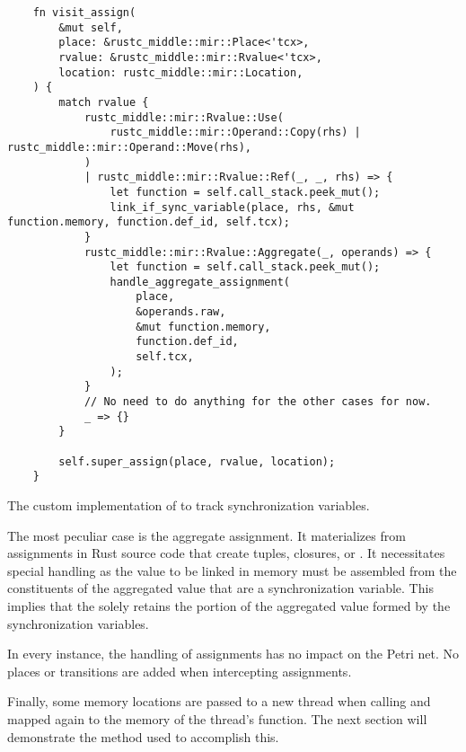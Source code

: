\begin{listing}[!htb]
  \begin{verbatim}
    fn visit_assign(
        &mut self,
        place: &rustc_middle::mir::Place<'tcx>,
        rvalue: &rustc_middle::mir::Rvalue<'tcx>,
        location: rustc_middle::mir::Location,
    ) {
        match rvalue {
            rustc_middle::mir::Rvalue::Use(
                rustc_middle::mir::Operand::Copy(rhs) | rustc_middle::mir::Operand::Move(rhs),
            )
            | rustc_middle::mir::Rvalue::Ref(_, _, rhs) => {
                let function = self.call_stack.peek_mut();
                link_if_sync_variable(place, rhs, &mut function.memory, function.def_id, self.tcx);
            }
            rustc_middle::mir::Rvalue::Aggregate(_, operands) => {
                let function = self.call_stack.peek_mut();
                handle_aggregate_assignment(
                    place,
                    &operands.raw,
                    &mut function.memory,
                    function.def_id,
                    self.tcx,
                );
            }
            // No need to do anything for the other cases for now.
            _ => {}
        }

        self.super_assign(place, rvalue, location);
    }
  \end{verbatim}
  \caption{The custom implementation of  to track synchronization variables.}
  \label{lst:visit-assign}
\end{listing}

The most peculiar case is the aggregate assignment.
It materializes from assignments in Rust source code
that create tuples, closures, or .
It necessitates special handling as the value to be linked in memory must be assembled
from the constituents of the aggregated value that are a synchronization variable.
This implies that the  solely retains the portion of the aggregated value
formed by the synchronization variables.

In every instance, the handling of assignments has no impact on the Petri net.
No places or transitions are added when intercepting assignments.

Finally, some memory locations are passed to a new thread when
calling 
and mapped again to the memory of the thread's function.
The next section will demonstrate the method used to accomplish this.
